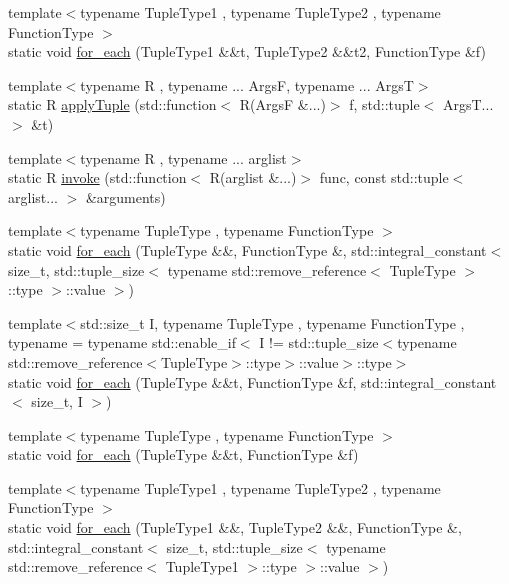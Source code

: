 \begin{DoxyCompactItemize}
\item 
{\footnotesize template$<$typename Tuple\+Type1 , typename Tuple\+Type2 , typename Function\+Type $>$ }\\static void \mbox{\hyperlink{structfakeit_1_1TupleDispatcher_a1ddb90f24aa73dd61bf2b95c5f176cd5}{for\+\_\+each}} (Tuple\+Type1 \&\&t, Tuple\+Type2 \&\&t2, Function\+Type \&f)
\item 
{\footnotesize template$<$typename R , typename ... ArgsF, typename ... ArgsT$>$ }\\static R \mbox{\hyperlink{structfakeit_1_1TupleDispatcher_ac57ede994f304c03e3982e6fa4d1ca41}{apply\+Tuple}} (std\+::function$<$ R(ArgsF \&...)$>$ f, std\+::tuple$<$ Args\+T... $>$ \&t)
\item 
{\footnotesize template$<$typename R , typename ... arglist$>$ }\\static R \mbox{\hyperlink{structfakeit_1_1TupleDispatcher_a279619fd6d6649c4d99c459a3286469a}{invoke}} (std\+::function$<$ R(arglist \&...)$>$ func, const std\+::tuple$<$ arglist... $>$ \&arguments)
\item 
{\footnotesize template$<$typename Tuple\+Type , typename Function\+Type $>$ }\\static void \mbox{\hyperlink{structfakeit_1_1TupleDispatcher_af22c1fae8c695f722da986df9af411ca}{for\+\_\+each}} (Tuple\+Type \&\&, Function\+Type \&, std\+::integral\+\_\+constant$<$ size\+\_\+t, std\+::tuple\+\_\+size$<$ typename std\+::remove\+\_\+reference$<$ Tuple\+Type $>$\+::type $>$\+::value $>$)
\item 
{\footnotesize template$<$std\+::size\+\_\+t I, typename Tuple\+Type , typename Function\+Type , typename  = typename std\+::enable\+\_\+if$<$            I != std\+::tuple\+\_\+size$<$typename std\+::remove\+\_\+reference$<$\+Tuple\+Type$>$\+::type$>$\+::value$>$\+::type$>$ }\\static void \mbox{\hyperlink{structfakeit_1_1TupleDispatcher_afd32e025fbf695e16bb4b4ac1642c491}{for\+\_\+each}} (Tuple\+Type \&\&t, Function\+Type \&f, std\+::integral\+\_\+constant$<$ size\+\_\+t, I $>$)
\item 
{\footnotesize template$<$typename Tuple\+Type , typename Function\+Type $>$ }\\static void \mbox{\hyperlink{structfakeit_1_1TupleDispatcher_a8fd292a71795aae0aba215dad28ee4c2}{for\+\_\+each}} (Tuple\+Type \&\&t, Function\+Type \&f)
\item 
{\footnotesize template$<$typename Tuple\+Type1 , typename Tuple\+Type2 , typename Function\+Type $>$ }\\static void \mbox{\hyperlink{structfakeit_1_1TupleDispatcher_a30fb1a59df83f4faaa461d3fee4b20bc}{for\+\_\+each}} (Tuple\+Type1 \&\&, Tuple\+Type2 \&\&, Function\+Type \&, std\+::integral\+\_\+constant$<$ size\+\_\+t, std\+::tuple\+\_\+size$<$ typename std\+::remove\+\_\+reference$<$ Tuple\+Type1 $>$\+::type $>$\+::value $>$)

\end{DoxyCompactItemize}
